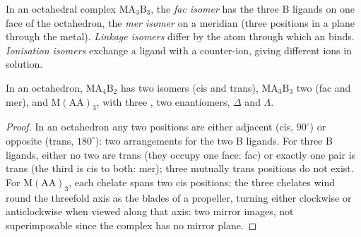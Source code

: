 \begin{definition}\label{def:b2:coordination-complexes:isomers}
In an octahedral complex $\mathrm{MA_3B_3}$, the \emph{fac isomer} has
the three B ligands on one face of the octahedron, the \emph{mer
isomer} on a meridian (three positions in a plane through the
metal). \emph{Linkage isomers} differ by the atom through which
an  binds. \emph{Ionisation isomers}
exchange a ligand with a counter-ion, giving different ions in solution.
\end{definition}

\begin{proposition}\label{prop:b2:coordination-complexes:isomer-count}
In an octahedron, $\mathrm{MA_4B_2}$ has two isomers (cis and trans), $\mathrm{MA_3B_3}$ two
(fac and mer), and $\mathrm M(\mathrm{AA})_3$, with three , two
enantiomers, $\Delta$ and $\Lambda$.
\end{proposition}

\begin{proof}
In an octahedron any two positions are either adjacent (cis, $90^\circ$) or opposite
(trans, $180^\circ$): two arrangements for the two B ligands. For three B ligands,
either no two are trans (they occupy one face: fac) or exactly one pair is trans (the
third is cis to both: mer); three mutually trans positions do not exist. For
$\mathrm M(\mathrm{AA})_3$, each chelate spans two cis positions; the three chelates
wind round the threefold axis as the blades of a propeller, turning either clockwise
or anticlockwise when viewed along that axis: two mirror images, not superimposable
since the complex has no mirror plane.
\end{proof}

